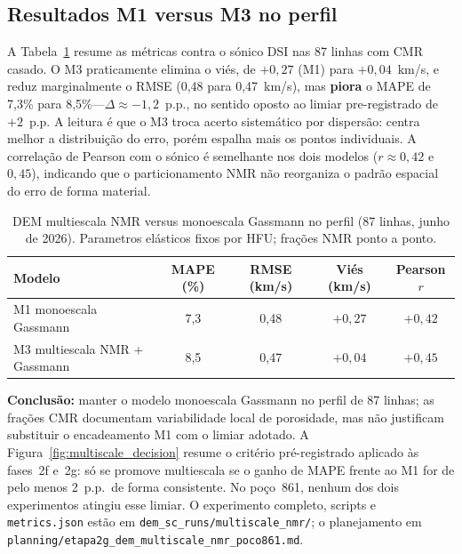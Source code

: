 \documentclass[11pt,a4paper]{article}
\numberwithin{equation}{section}
\begin{document}
\subsection{Resultados M1 versus M3 no perfil}

A Tabela~\ref{tab:multiscale_nmr} resume as métricas contra o sónico DSI nas
87 linhas com CMR casado.
O M3 praticamente elimina o viés, de $+0{,}27$ (M1) para $+0{,}04$~km/s, e
reduz marginalmente o RMSE (0,48 para 0,47~km/s), mas \textbf{piora} o MAPE
de 7,3\% para 8,5\%---$\Delta \approx -1{,}2$~p.p., no sentido oposto ao
limiar pre-registrado de $+2$~p.p.
A leitura é que o M3 troca acerto sistemático por dispersão: centra melhor a
distribuição do erro, porém espalha mais os pontos individuais.
A correlação de Pearson com o sónico é semelhante nos dois modelos
($r \approx 0{,}42$ e $0{,}45$), indicando que o particionamento NMR não
reorganiza o padrão espacial do erro de forma material.

\begin{table}[H]
  \centering
  \caption{DEM multiescala NMR versus monoescala Gassmann no perfil
           (87 linhas, junho de 2026). Parametros elásticos fixos por HFU;
           frações NMR ponto a ponto.}
  \label{tab:multiscale_nmr}
  \small
  \begin{tabular}{lcccc}
    \toprule
    Modelo & MAPE (\%) & RMSE (km/s) & Viés (km/s) & Pearson $r$ \\
    \midrule
    M1 monoescala Gassmann & 7,3 & 0,48 & $+0{,}27$ & $+0{,}42$ \\
    M3 multiescala NMR + Gassmann & 8,5 & 0,47 & $+0{,}04$ & $+0{,}45$ \\
    \bottomrule
  \end{tabular}
\end{table}

\textbf{Conclusão:} manter o modelo monoescala Gassmann no perfil de 87
linhas; as frações CMR documentam variabilidade local de porosidade, mas não
justificam substituir o encadeamento M1 com o limiar adotado.
A Figura~\ref{fig:multiscale_decision} resume o critério pré-registrado
aplicado às fases~2f e~2g: só se promove multiescala se o ganho de MAPE
frente ao M1 for de pelo menos 2~p.p.\ de forma consistente.
No poço~861, nenhum dos dois experimentos atingiu esse limiar.
O experimento completo, scripts e \texttt{metrics.json} estão em
\texttt{dem\_sc\_runs/multiscale\_nmr/}; o planejamento em
\texttt{planning/etapa2g\_dem\_multiscale\_nmr\_poco861.md}.
\end{document}
